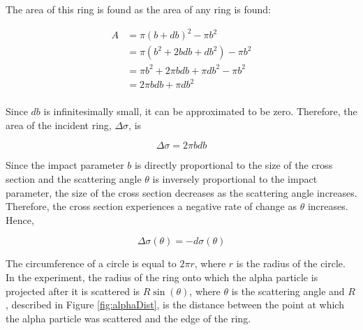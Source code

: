 \documentclass[a4paper]{article}
\begin{document}
The area of this ring is found as the area of any ring is found:

\begin{align*}
  A &= \pi (b + db)^2 - \pi b^2 \\
    &= \pi (b^2 + 2 b db + db^2) - \pi b^2 \\
    &= \pi b^2 + 2 \pi b db + \pi db^2 - \pi b^2 \\
    &= 2 \pi b db + \pi db^2 \\
\end{align*}

Since \( db \) is infinitesimally small, it can be approximated to be
zero. Therefore, the area of the incident ring, \( \Delta \sigma \), is

\begin{equation}
  \Delta \sigma = 2 \pi b db
\end{equation}
\label{eqn:deltaSigma}

%

\qq Since the impact parameter \( b \) is directly proportional to the size of
the cross section and the scattering angle \( \theta \) is inversely
proportional to the impact parameter, the size of the cross section decreases as
the scattering angle increases. Therefore, the cross section experiences a
negative rate of change as \( \theta \) increases. Hence, 

\begin{equation}
  \Delta \sigma (\theta) = - d\sigma (\theta) 
\end{equation}
\label{eqn:dSigma}

\qq The circumference of a circle is equal to \( 2 \pi r \), where \( r \) is
the radius of the circle. In the experiment, the radius of the ring onto which
the alpha particle is projected after it is scattered is \( R \sin{(\theta)} \),
where \( \theta \) is the scattering angle and \( R \), described in Figure
\ref{fig:alphaDist}, is the distance between the point at which the alpha
particle was scattered and the edge of the ring.
\end{document}
